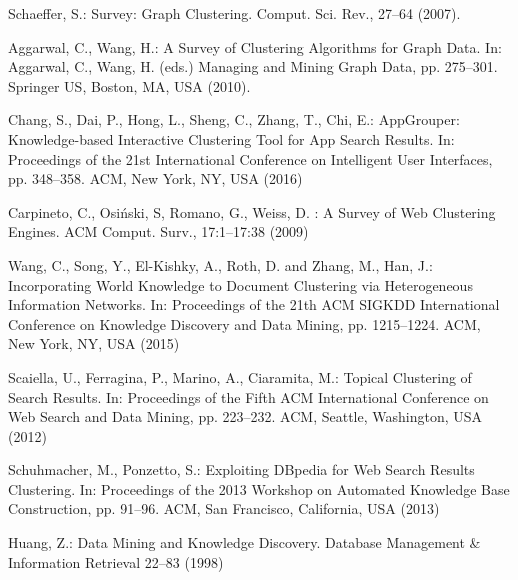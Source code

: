 \documentclass[runningheads]{llncs}
\begin{document}
\begin{thebibliography}{8}
Schaeffer, S.: Survey: Graph Clustering. Comput. Sci. Rev., 27--64 (2007). 

Aggarwal, C., Wang, H.: A Survey of Clustering Algorithms for Graph Data. In: Aggarwal, C., Wang, H. (eds.) Managing and Mining Graph Data, pp. 275--301.
Springer US, Boston, MA, USA (2010). 

Chang, S., Dai, P., Hong, L., Sheng, C., Zhang, T., Chi, E.: AppGrouper: Knowledge-based Interactive Clustering Tool for App Search Results. In: Proceedings of the 21st International Conference on Intelligent User Interfaces, pp. 348--358. ACM, New York, NY, USA (2016) 

Carpineto, C., Osi\'{n}ski, S, Romano, G., Weiss, D. : A Survey of Web Clustering Engines. ACM Comput. Surv., 17:1--17:38 (2009)

Wang, C., Song, Y., El-Kishky, A., Roth, D. and Zhang, M., Han, J.: Incorporating World Knowledge to Document Clustering via Heterogeneous Information Networks. In: Proceedings of the 21th ACM SIGKDD International Conference on Knowledge Discovery and Data Mining, pp. 1215--1224. ACM, New York, NY, USA (2015)

Scaiella, U., Ferragina, P., Marino, A., Ciaramita, M.: Topical Clustering of Search Results. In: Proceedings of the Fifth ACM International Conference on Web Search and Data Mining, pp. 223--232. ACM, Seattle, Washington, USA (2012) 

Schuhmacher, M., Ponzetto, S.: Exploiting DBpedia for Web Search Results Clustering. In: Proceedings of the 2013 Workshop on Automated Knowledge Base Construction, pp. 91--96. ACM, San Francisco, California, USA (2013) 

Huang, Z.: Data Mining and Knowledge Discovery. Database Management \& Information Retrieval 22--83 (1998)  

\end{thebibliography}

\end{document}
